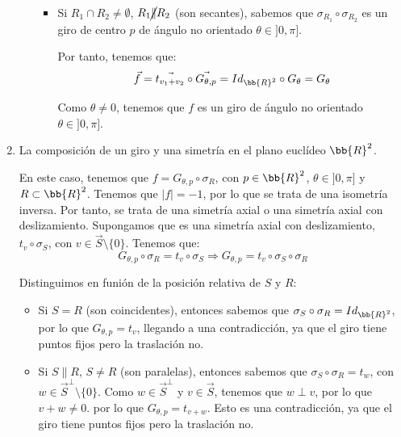 \begin{ejercicio}
\begin{enumerate}
\begin{itemize}
\begin{itemize}
                \item Si $R_1\cap R_2 \neq \emptyset$, $R_1 \cancel{\|} R_2$ (son secantes), 
                sabemos que $\sigma_{R_1} \circ \sigma_{R_2}$ es un giro de centro $p$ de ángulo no orientado $\theta \in ]0, \pi]$.

                Por tanto, tenemos que:
                \begin{equation*}
                    \vec{f} = \vec{t_{v_1+v_2}} \circ \vec{G_{\theta, p}} = Id_{\bb{R}^2} \circ G_{\theta} = G_{\theta}
                \end{equation*}

                Como $\theta \neq 0$, tenemos que $f$ es un giro de ángulo no orientado $\theta \in ]0, \pi]$.
            \end{itemize}
        \end{itemize}


        \item La composición de un giro y una simetría en el plano euclídeo $\bb{R}^2$.
        
        En este caso, tenemos que $f = G_{\theta, p} \circ \sigma_{R}$, con $p\in \bb{R}^2$, $\theta \in ]0, \pi]$ y $R\subset \bb{R}^2$.
        Tenemos que $|f| = -1$, por lo que se trata de una isometría inversa.
        Por tanto, se trata de una simetría axial o una simetría axial con deslizamiento. Supongamos que
        es una simetría axial con deslizamiento, $t_v\circ \sigma_{S}$, con $v\in \vec{S}\setminus \{0\}$. Tenemos que:
        \begin{equation*}
            G_{\theta, p} \circ \sigma_{R} = t_v\circ \sigma_{S} \Longrightarrow
            G_{\theta, p} = t_v\circ \sigma_{S} \circ \sigma_{R}
        \end{equation*}

        Distinguimos en funión de la posición relativa de $S$ y $R$:
        \begin{itemize}
            \item Si $S=R$ (son coincidentes), entonces sabemos que $\sigma_{S} \circ \sigma_{R}= Id_{\bb{R}^2}$,
            por lo que $G_{\theta, p}=t_v$, llegando a una contradicción, ya que el giro tiene puntos fijos pero la traslación no.

            \item Si $S \| R$, $S \neq R$ (son paralelas), entonces sabemos que $\sigma_{S} \circ \sigma_{R}=t_w$, con $w\in \vec{S}^\perp \setminus \{0\}$.
            Como $w\in \vec{S}^\perp$ y $v\in \vec{S}$, tenemos que $w\perp v$, por lo que $v+w \neq 0$.
            por lo que $G_{\theta, p}=t_{v+w}$. Esto es una contradicción, ya que el giro tiene puntos fijos pero la traslación no.


\end{itemize}
\end{enumerate}
\end{ejercicio}
